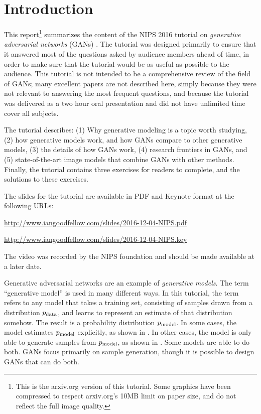 \section*{Introduction}


This report\footnote{This is the arxiv.org version of this tutorial.
  Some graphics have been compressed to respect arxiv.org's 10MB limit on paper size,
  and do not reflect the full image quality.
}
summarizes the content of the NIPS 2016 tutorial on {\em generative adversarial networks}
(GANs) \citep{Goodfellow-et-al-NIPS2014-small}.
The tutorial was designed primarily to ensure that it answered most of
the questions asked by audience members ahead of time, in order to make sure
that the tutorial would be as useful as possible to the audience.
This tutorial is not intended to be a comprehensive review of the field
of GANs; many excellent papers are not described here, simply because
they were not relevant to answering the most frequent questions, and because
the tutorial was delivered as a two hour oral presentation and did not
have unlimited time cover all subjects.

The tutorial describes:
(1) Why generative modeling is a topic worth studying,
(2) how generative models work, and how GANs compare to other generative models,
(3) the details of how GANs work,
(4) research frontiers in GANs, and
(5) state-of-the-art image models that combine GANs with other methods.
Finally, the tutorial contains three exercises for readers to complete,
and the solutions to these exercises.

The slides for the tutorial are available in PDF and Keynote format at the following URLs:

\url{http://www.iangoodfellow.com/slides/2016-12-04-NIPS.pdf}

\url{http://www.iangoodfellow.com/slides/2016-12-04-NIPS.key}

The video was recorded by the NIPS foundation and should be made available at a later date.

Generative adversarial networks are an example of {\em generative models}.
The term ``generative model'' is used in many different ways.
In this tutorial, the term refers to any model that takes a training set,
consisting of samples drawn from a distribution $p_{\rm{data}}$, and learns to
represent an estimate of that distribution somehow.
The result is a probability distribution $p_{\rm{model}}$.
In some cases, the model estimates $p_{\rm{model}}$ explicitly, as shown in
.
In other cases, the model is only able to generate samples from
$p_{\rm{model}}$, as shown in .
Some models are able to do both.
GANs focus primarily on sample generation, though it is possible to
design GANs that can do both.

